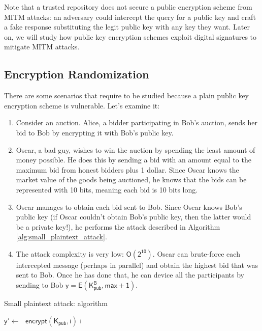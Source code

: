 \documentclass{article}
\begin{document}
\par \noindent Note that a trusted repository does not secure a public encryption scheme from MITM attacks: an adversary could intercept the query for a public key and craft a fake response substituting the legit public key with any key they want. Later on, we will study how public key encryption schemes exploit digital signatures to mitigate MITM attacks.


\subsection{Encryption Randomization}

There are some scenarios that require to be studied because a plain public key encryption scheme is vulnerable. Let's examine it:

\begin{enumerate}
    \item Consider an auction. Alice, a bidder participating in Bob's auction, sends her bid to Bob by encrypting it with Bob's public key.
    \item Oscar, a bad guy, wishes to win the auction by spending the least amount of money possible. He does this by sending a bid with an amount equal to the maximum bid from honest bidders plus 1 dollar. Since Oscar knows the market value of the goods being auctioned, he knows that the bids can be represented with 10 bits, meaning each bid is 10 bits long.
    \item Oscar manages to obtain each bid sent to Bob. Since Oscar knows Bob's public key (if Oscar couldn't obtain Bob's public key, then the latter would be a private key!), he performs the attack described in Algorithm \ref{alg:small_plaintext_attack}.
    \item The attack complexity is very low: $\mathsf{O(2^{10})}$. Oscar can brute-force each intercepted message (perhaps in parallel) and obtain the highest bid that was sent to Bob. Once he has done that, he can device all the participants by sending to Bob $\mathsf{y = E(K_{pub}^{B}, \text{max} + 1)}$.
\end{enumerate}

\begin{algorithm}
    \caption{Small plaintext attack: algorithm}
    \label{alg:small_plaintext_attack}
    \begin{algorithmic}
            \State $\mathsf{y' \gets \text{ } encrypt(K_{pub}, i)}$
                \Return $\mathsf{i}$
            \EndIf
        \EndFor
    \end{algorithmic}
\end{algorithm}
\end{document}
